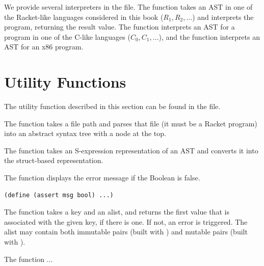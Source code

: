 \documentclass[11pt]{book}
\begin{document}
We provide several interpreters in the  file.  The
 function takes an AST in one of the Racket-like
languages considered in this book ($R_1, R_2, \ldots$) and interprets
the program, returning the result value.  The  function
interprets an AST for a program in one of the C-like languages ($C_0,
C_1, \ldots$), and the  function interprets an AST
for an x86 program.

\section{Utility Functions}
\label{appendix:utilities}

The utility function described in this section can be found in the
 file.

The  function takes a file path and parses that file
(it must be a Racket program) into an abstract syntax tree with a
 node at the top.

The  function takes an S-expression representation
of an AST and converts it into the struct-based representation.

The  function displays the error message  if the
Boolean  is false.
\begin{lstlisting}
(define (assert msg bool) ...)
\end{lstlisting}

The  function takes a key and an alist, and returns the
first value that is associated with the given key, if there is one. If
not, an error is triggered.  The alist may contain both immutable
pairs (built with ) and mutable pairs (built with
).

The  function ...




\end{document}
